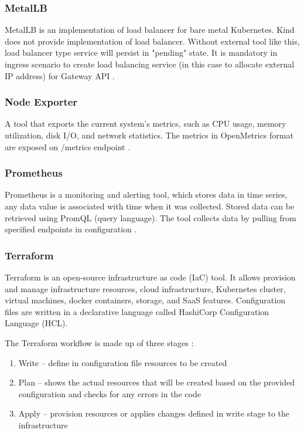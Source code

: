 \subsubsection{MetalLB}
\label{sec:metallb}

MetalLB is an implementation of load balancer for bare metal Kubernetes. Kind does not provide implementation of load balancer. Without external tool like this, load balancer type service will persist in "pending" state. It is mandatory in ingress scenario to create load balancing service (in this case to allocate external IP address) for Gateway API \cite{MetalLB}.

\subsubsection{Node Exporter}
\label{sec:nodeExporter}

A tool that exports the current system's metrics, such as CPU usage, memory utilization, disk I/O, and network statistics. The metrics in OpenMetrics format are exposed on /metrics endpoint \cite{NodeExporter}.

\subsubsection{Prometheus}
\label{sec:prometheus}

Prometheus is a monitoring and alerting tool, which stores data in time series, any data value is associated with time when it was collected. Stored data can be retrieved using PromQL (query language). The tool collects data by pulling from specified endpoints in configuration \cite{Prometheus}. 

\subsubsection{Terraform}
\label{sec:terraform}

Terraform is an open-source infrastructure as code (IaC) tool. It allows provision and manage infrastructure resources, cloud infrastructure, Kubernetes cluster, virtual machines, docker containers, storage, and SaaS features. Configuration files are written in a declarative language called HashiCorp Configuration Language (HCL).

The Terraform workflow is made up of three stages \cite{Terraform}:
\begin{enumerate}
  \item Write -- define in configuration file resources to be created
  \item Plan -- shows the actual resources that will be created based on the provided configuration and checks for any errors in the code
  \item Apply -- provision resources or applies changes defined in write stage to the infrastructure 
\end{enumerate}



